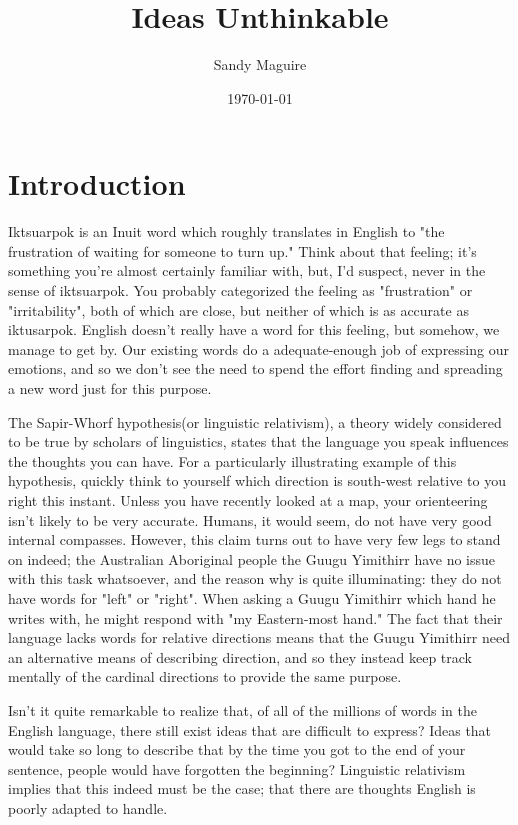 \documentclass[12pt]{book}
\title{Ideas Unthinkable}
\author{Sandy Maguire}
\date{\today}
\renewcommand{\cite}[1]{}
\begin{document}
 \maketitle

\chapter{Introduction}
Iktsuarpok is an Inuit word which roughly translates in English to "the frustration of waiting for someone to turn up."
Think about that feeling; it's something you're almost certainly familiar with, but, I'd suspect, never in the sense of
iktsuarpok. You probably categorized the feeling as "frustration" or "irritability", both of which are close, but
neither of which is as accurate as iktusarpok. English doesn't really have a word for this feeling, but somehow, we
manage to get by. Our existing words do a adequate-enough job of expressing our emotions, and so we don't see the need
to spend the effort finding and spreading a new word just for this purpose.

The Sapir-Whorf hypothesis(or linguistic relativism), a theory widely considered
to be true by scholars of linguistics, states that the language you speak influences the thoughts you can have. For a
particularly illustrating example of this hypothesis, quickly think to yourself which direction is south-west relative
to you right this instant.  Unless you have recently looked at a map, your orienteering isn't likely to be very
accurate. Humans, it would seem, do not have very good internal compasses. However, this claim turns out to have very
few legs to stand on indeed; the Australian Aboriginal people the Guugu Yimithirr
\cite{http://en.wikipedia.org/wiki/Relative_direction} have no issue with this task whatsoever, and the reason why is
quite illuminating: they do not have words for "left" or "right". When asking a Guugu Yimithirr which hand he writes
with, he might respond with "my Eastern-most hand." The fact that their language lacks words for relative directions
means that the Guugu Yimithirr need an alternative means of describing direction, and so they instead keep track
mentally of the cardinal directions to provide the same purpose.

Isn't it quite remarkable to realize that, of all of the millions of words in the
English language, there still exist ideas that are difficult to express? Ideas that would take so long to describe that
by the time you got to the end of your sentence, people would have forgotten the beginning? Linguistic relativism
implies that this indeed must be the case; that there are thoughts English is poorly adapted to handle.
\end{document}
